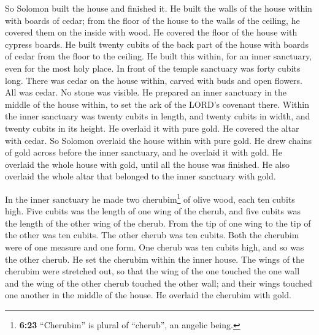  So Solomon built the house and finished it.
 He built the walls of the house within with boards of
cedar; from the floor of the house to the walls of the ceiling, he
covered them on the inside with wood. He covered the floor of the house
with cypress boards.  He built twenty cubits of the back
part of the house with boards of cedar from the floor to the ceiling. He
built this within, for an inner sanctuary, even for the most holy place.
 In front of the temple sanctuary was forty cubits long.
 There was cedar on the house within, carved with buds
and open flowers. All was cedar. No stone was visible. 
He prepared an inner sanctuary in the middle of the house within, to set
the ark of the LORD's covenant there.  Within the inner
sanctuary was twenty cubits in length, and twenty cubits in width, and
twenty cubits in its height. He overlaid it with pure gold. He covered
the altar with cedar.  So Solomon overlaid the house
within with pure gold. He drew chains of gold across before the inner
sanctuary, and he overlaid it with gold.  He overlaid the
whole house with gold, until all the house was finished. He also
overlaid the whole altar that belonged to the inner sanctuary with gold.

 In the inner sanctuary he made two cherubim\footnote{\textbf{6:23}
  ``Cherubim'' is plural of ``cherub'', an angelic being.} of olive
wood, each ten cubits high.  Five cubits was the length
of one wing of the cherub, and five cubits was the length of the other
wing of the cherub. From the tip of one wing to the tip of the other was
ten cubits.  The other cherub was ten cubits. Both the
cherubim were of one measure and one form.  One cherub
was ten cubits high, and so was the other cherub.  He set
the cherubim within the inner house. The wings of the cherubim were
stretched out, so that the wing of the one touched the one wall and the
wing of the other cherub touched the other wall; and their wings touched
one another in the middle of the house.  He overlaid the
cherubim with gold.

